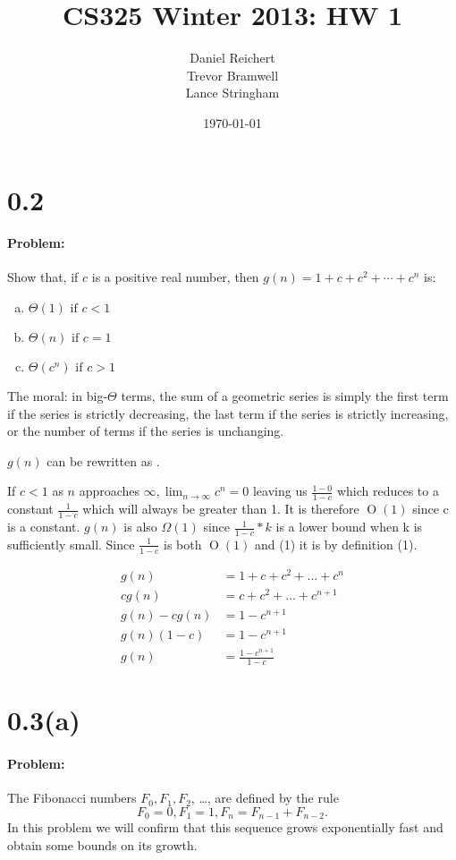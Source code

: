 \documentclass[12pt]{article}
\title{CS325 Winter 2013: HW 1}
\author{
    Daniel Reichert \\
    Trevor Bramwell \\
    Lance Stringham
}
\date{\today}
\newcommand{\BigO}[1]{\ensuremath{\operatorname{O}\left(#1\right)}}
\begin{document}
\maketitle

\section*{0.2}
\paragraph{Problem:}
Show that, if $c$ is a positive real number, then $g(n)=1+c+c^2+\cdots+c^n$ is:

\begin{enumerate}[(a)]
\item $\Theta(1) \text{ if } c < 1$
\item $\Theta(n) \text{ if } c = 1$
\item $\Theta(c^n) \text{ if } c > 1$
\end{enumerate}

The moral: in big-$\Theta$ terms, the sum of a geometric series is simply the
first term if the series is
strictly decreasing, the last term if the series is strictly increasing,
or the number of terms if the
series is unchanging.

$g(n)$ can be rewritten as .

If $c < 1$ as $n$ approaches $\infty, \lim_{n \to \infty} c^n = 0$ leaving us
$\frac{1-0}{1-c}$ which reduces to a constant $\frac{1}{1-c}$ which will always
be greater than 1. It is therefore $\BigO{1}$ since c is a constant. $g(n)$ is also
$\Omega(1)$ since $\frac{1}{1-c}*k$ is a lower bound when k is sufficiently small.
Since $\frac{1}{1-c}$ is both $\BigO{1}$ and \Omega(1) it is by definition \Theta(1).

\begin{align*}
    g(n) &= 1 + c + c^2 + \dots + c^{n} \\
    cg(n) &= c + c^2 + \dots + c^{n+1} \\
    g(n) - cg(n) &= 1 - c^{n+1} \\
    g(n)(1 - c) &= 1 - c^{n+1} \\
    g(n) &= \frac{1 - c^{n+1}}{1 - c}
\end{align*}

\section*{0.3(a)}
\paragraph{Problem:}
The Fibonacci numbers $F_0, F_1, F_2$, \ldots, are defined by the rule
\[ F_0 = 0, F_1 = 1, F_n = F_{n - 1} + F_{n - 2}. \]
In this problem we will confirm that this sequence grows exponentially
fast and obtain some
bounds on its growth.
\end{document}
